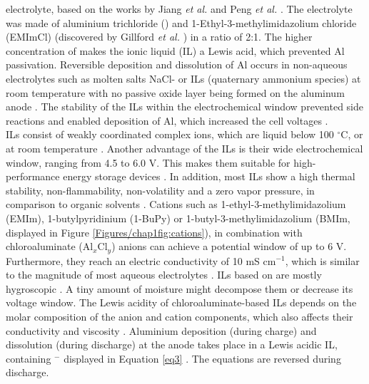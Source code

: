 electrolyte, based on the works by Jiang \textit{et al.} and Peng \textit{et al.} \cite{paranthaman_transformational_2010, jiang_electrodeposition_2006, peng_investigation_2008}. 
The electrolyte was made of aluminium trichloride () and 1-Ethyl-3-methylimidazolium chloride (EMImCl) (discovered by Gillford \textit{et al.} \cite{gifford_aluminum/chlorine_1988}) in a ratio of 2:1. The higher concentration of  makes the ionic liquid (IL) a Lewis acid, which prevented Al passivation. 
Reversible deposition and dissolution of Al occurs in non-aqueous electrolytes such as molten salts NaCl- or ILs (quaternary ammonium species) at room temperature with no passive oxide layer being formed on the aluminum anode \cite{vestergaard_molten_1993, galinski_ionic_2006, elia_insights_2017}. The stability of the ILs within the electrochemical window prevented side reactions and enabled deposition of Al, which increased the cell voltages \cite{li_aluminum_2002}.\\ ILs consist of weakly coordinated complex ions, which are liquid below 100 $^{\circ}$C, or at room temperature \cite{hayes_structure_2015}. Another advantage of the ILs is their wide electrochemical window, ranging from 4.5 to 6.0 V. This makes them suitable for high-performance energy storage devices \cite{wang_binder-free_2015}. In addition, most ILs show a high thermal stability, non-flammability, non-volatility and a zero vapor pressure, in comparison to organic solvents \cite{dieter_ionic_1988}. Cations such as 1-ethyl-3-methylimidazolium (EMIm), 1-butylpyridinium (1-BuPy) or 1-butyl-3-methylimidazolium (BMIm, displayed in Figure \ref{Figures/chap1fig:cations}), in combination with chloroaluminate (Al$_x$Cl$_y$) anions can achieve a potential window of up to 6 V. Furthermore, they reach an electric conductivity of 10 mS cm$^{-1}$, which is similar to the magnitude of most aqueous electrolytes \cite{ngo_thermal_2000}. ILs based on  are mostly hygroscopic \cite{ueda_electroplating_2012}. A tiny amount of moisture might decompose them or decrease its voltage window. The Lewis acidity of chloroaluminate-based ILs depends on the molar composition of the anion and cation components, which also affects their conductivity and viscosity \cite{buzzeo_non-haloaluminate_2004}. Aluminium deposition (during charge) and dissolution (during discharge) at the anode takes place in a Lewis acidic IL, containing $^-$ displayed in Equation \ref{eq3} \cite{galinski_ionic_2006}. The equations are reversed during discharge.\\

